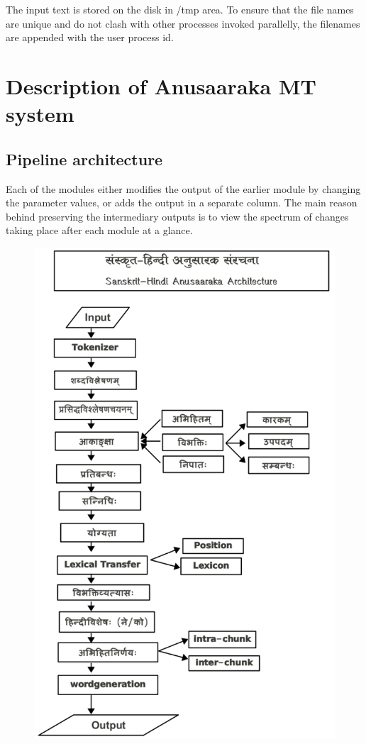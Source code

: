 \documentclass{llncs}
\begin{document}
\noindent 
The input text is stored on the disk in /tmp area. To ensure that the file names are unique and do not clash with other processes invoked parallelly, the filenames are appended with the user process id.

\section{Description of Anusaaraka MT system}

\subsection{Pipeline architecture}

Each of the modules either modifies the output of the earlier module by changing the parameter values, or adds the output in a separate column. The main reason behind preserving the intermediary outputs is to view the spectrum of changes taking place after each module at a glance.

\begin{figure}
\begin{center}
\includegraphics[scale=0.50]{anu_archi.eps}
\end{center}
\end{figure}
\end{document}
